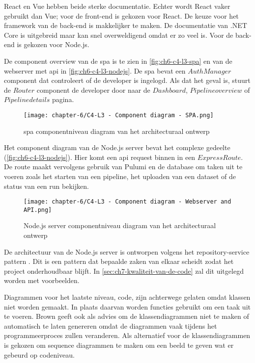 React en Vue hebben beide sterke documentatie. Echter wordt React vaker gebruikt dan Vue; voor de front-end is gekozen voor React. De keuze voor het framework van de back-end is makkelijker te maken. De documentatie van .NET Core is uitgebreid maar kan snel overweldigend omdat er zo veel is. Voor de back-end is gekozen voor Node.js.

De component overview van de \acrshort{spa} is te zien in \autoref{fig:ch6-c4-l3-spa} en van de webserver met \acrshort{api} in \autoref{fig:ch6-c4-l3-nodejs}. De \acrshort{spa} bevat een \(AuthManager\) component dat controleert of de developer is ingelogd. Als dat het geval is, stuurt de \(Router\) component de developer door naar de \(Dashboard\), \(Pipeline overview\) of \(Pipeline details\) pagina.

\begin{figure}[hbt!]
  \centering
  \texttt{[image: chapter-6/C4-L3 - Component diagram - SPA.png]}
  \caption{\Acrfull{spa} componentniveau diagram van het architecturaal ontwerp}
  \label{fig:ch6-c4-l3-spa}
\end{figure}

Het component diagram van de Node.js server bevat het complexe gedeelte (\autoref{fig:ch6-c4-l3-nodejs}). Hier komt een \acrshort{api} request binnen in een \(Express Route\). De route maakt vervolgens gebruik van Pulumi en de database om taken uit te voeren zoals het starten van een pipeline, het uploaden van een dataset of de status van een run bekijken.

\begin{figure}[hbt!]
  \centering
  \texttt{[image: chapter-6/C4-L3 - Component diagram - Webserver and API.png]}
  \caption{Node.js server componentniveau diagram van het architecturaal ontwerp}
  \label{fig:ch6-c4-l3-nodejs}
\end{figure}

De architectuur van de Node.js server is ontworpen volgens het repository-service pattern \cite{repository-service-pattern}. Dit is een pattern dat bepaalde zaken van elkaar scheidt zodat het project onderhoudbaar blijft. In \autoref{sec:ch7-kwaliteit-van-de-code} zal dit uitgelegd worden met voorbeelden.

Diagrammen voor het laatste niveau, code, zijn achterwege gelaten omdat klassen niet worden gemaakt. In plaats daarvan worden functies gebruikt om een taak uit te voeren. Brown geeft ook als advies om de klassendiagrammen niet te maken of automatisch te laten genereren \cite{c4-model-faq} omdat de diagrammen vaak tijdens het programmeerproces zullen veranderen. Als alternatief voor de klassendiagrammen is gekozen om sequence diagrammen te maken om een beeld te geven wat er gebeurd op codeniveau.

